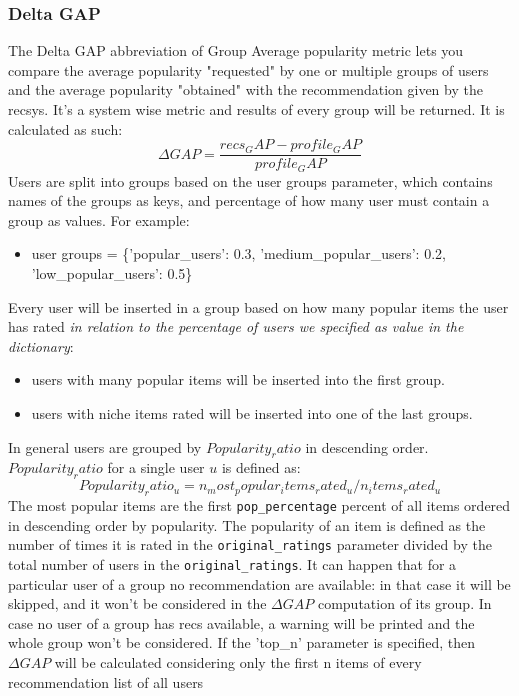 \documentclass[11pt]{article}
\begin{document}
\subsubsection{Delta GAP}\label{subsubsec:dg}
The Delta GAP abbreviation of Group Average popularity metric lets you compare the average popularity "requested" by
one or multiple groups of users and the average popularity "obtained" with the recommendation given by the recsys.
It's a system wise metric and results of every group will be returned.
It is calculated as such:
\hfill\break
\hfill\break
    \[
        \Delta GAP = \frac{recs_GAP - profile_GAP}{profile_GAP}
    \]
\hfill\break
\hfill\break
Users are split into groups based on the user groups parameter, which contains names of the groups as keys,
and percentage of how many user must contain a group as values.
For example:
\begin{itemize}
    \item user groups = \{'popular\_users': 0.3, 'medium\_popular\_users': 0.2, 'low\_popular\_users': 0.5\}
\end{itemize}
\hfill\break
\hfill\break
Every user will be inserted in a group based on how many popular items the user has rated
\textit{in relation to the percentage of users we specified as value in the dictionary}:
\begin{itemize}
    \item users with many popular items will be inserted into the first group.
    \item users with niche items rated will be inserted into one of the last groups.
\end{itemize}
\hfill\break
\hfill\break
In general users are grouped by $Popularity_ratio$ in descending order. $Popularity_ratio$ for a single user $u$
is defined as:
\hfill\break
\hfill\break
    \[
        Popularity_ratio_u = n_most_popular_items_rated_u / n_items_rated_u
    \]
\hfill\break
\hfill\break
The most popular items are the first \texttt{pop\_percentage} percent of all items ordered in descending order by
popularity.
The popularity of an item is defined as the number of times it is rated in the \texttt{original\_ratings} parameter
divided by the total number of users in the \texttt{original\_ratings}.
\hfill\break
\hfill\break
It can happen that for a particular user of a group no recommendation are available: in that case it will be skipped,
and it won't be considered in the $\Delta GAP$ computation of its group.
In case no user of a group has recs available, a warning will be printed and the whole group won't be considered.
If the 'top\_n' parameter is specified, then $\Delta GAP$ will be calculated considering only the first
n items of every recommendation list of all users
\hfill\break
\hfill\break
\end{document}

